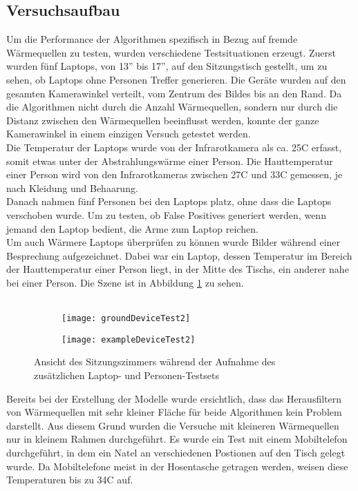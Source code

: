 \subsection{Versuchsaufbau}

Um die Performance der Algorithmen spezifisch in Bezug auf fremde Wärmequellen zu testen, wurden verschiedene Testsituationen erzeugt. Zuerst wurden fünf Laptops, von 13'' bis 17'', auf den Sitzungstisch gestellt, um zu sehen, ob Laptops ohne Personen Treffer generieren. Die Geräte wurden auf den gesamten Kamerawinkel verteilt, vom Zentrum des Bildes bis an den Rand. Da die Algorithmen nicht durch die Anzahl Wärmequellen, sondern nur durch die Distanz zwischen den Wärmequellen beeinflusst werden, konnte der ganze Kamerawinkel in einem einzigen Versuch getestet werden.\\
Die Temperatur der Laptops wurde von der Infrarotkamera als ca. 25\degree C erfasst, somit etwas unter der Abstrahlungswärme einer Person. Die Hauttemperatur einer Person wird von den Infrarotkameras zwischen 27\degree C und 33\degree C gemessen, je nach Kleidung und Behaarung.\\
Danach nahmen fünf Personen bei den Laptops platz,  ohne dass die Laptops verschoben wurde. Um zu testen, ob False Positives generiert werden, wenn jemand den Laptop bedient, die Arme zum Laptop reichen.\\
Um auch Wärmere Laptops überprüfen zu können wurde Bilder während einer Besprechung aufgezeichnet. Dabei war ein Laptop, dessen Temperatur im Bereich der Hauttemperatur einer Person liegt, in der Mitte des Tischs, ein anderer nahe bei einer Person. Die Szene ist in Abbildung \ref{fig:exampleDeviceTest2} zu sehen.\\
\\
\begin{figure}[htb]
	\centering
	\begin{subfigure}{.45\linewidth}
		\centering
		\texttt{[image: groundDeviceTest2]}
	\end{subfigure}
	\begin{subfigure}{.45\linewidth}
		\centering
		\texttt{[image: exampleDeviceTest2]}
	\end{subfigure}
	\caption{Ansicht des Sitzungszimmers während der Aufnahme des zusätzlichen Laptop- und Personen-Testsets}
	\label{fig:exampleDeviceTest2}
\end{figure}

\noindent
Bereits bei der Erstellung der Modelle wurde ersichtlich, dass das Herausfiltern von Wärmequellen mit sehr kleiner Fläche für beide Algorithmen kein Problem darstellt. Aus diesem Grund wurden die Versuche mit kleineren Wärmequellen nur in kleinem Rahmen durchgeführt. Es wurde ein Test mit einem Mobiltelefon durchgeführt, in dem ein Natel an verschiedenen Postionen auf den Tisch gelegt wurde. Da Mobiltelefone meist in der Hosentasche getragen werden, weisen diese Temperaturen bis zu 34\degree C auf.\\
\\

